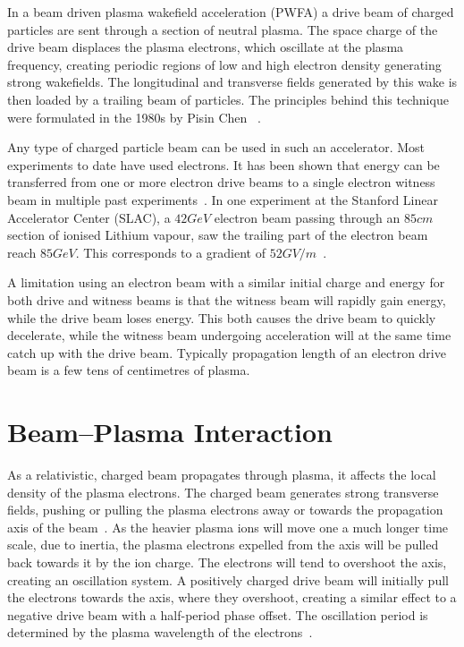 In a beam driven plasma wakefield acceleration (PWFA) a drive beam of charged particles are sent through a section of neutral plasma. The space charge of the drive beam displaces the plasma electrons, which oscillate at the plasma frequency, creating periodic regions of low and high electron density generating strong wakefields. The longitudinal and transverse fields generated by this wake is then loaded by a trailing beam of particles. The principles behind this technique were formulated in the 1980s by Pisin Chen \etal~\cite{chen:1985}.

Any type of charged particle beam can be used in such an accelerator. Most experiments to date have used electrons. It has been shown that energy can be transferred from one or more electron drive beams to a single electron witness beam in multiple past experiments~\cite{rosenzweig:1988, blumenfeld:2007, kallos:2007, litos:2014, nakajima:1990}. In one experiment at the Stanford Linear Accelerator Center (SLAC), a $42\unit{GeV}$ electron beam passing through an $85\unit{cm}$ section of ionised Lithium vapour, saw the trailing part of the electron beam reach $85\unit{GeV}$. This corresponds to a gradient of $52\unit{GV/m}$~\cite{blumenfeld:2007}.

A limitation using an electron beam with a similar initial charge and energy for both drive and witness beams is that the witness beam will rapidly gain energy, while the drive beam loses energy. This both causes the drive beam to quickly decelerate, while the witness beam undergoing acceleration will at the same time catch up with the drive beam. Typically propagation length of an electron drive beam is a few tens of centimetres of plasma.

\section{Beam--Plasma Interaction}
\label{Int:BPI}

As a relativistic, charged beam propagates through plasma, it affects the local density of the plasma electrons. The charged beam generates strong transverse fields, pushing or pulling the plasma electrons away or towards the propagation axis of the beam~\cite{lee:2001,adli:2016b}. As the heavier plasma ions will move one a much longer time scale, due to inertia, the plasma electrons expelled from the axis will be pulled back towards it by the ion charge. The electrons will tend to overshoot the axis, creating an oscillation system. A positively charged drive beam will initially pull the electrons towards the axis, where they overshoot, creating a similar effect to a negative drive beam with a half-period phase offset. The oscillation period is determined by the plasma wavelength of the electrons~\cite{hogan:2016,muggli:2017}. 

